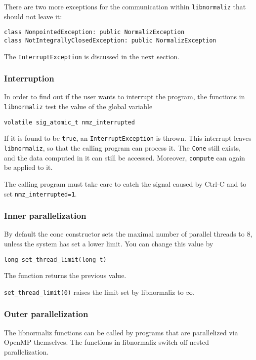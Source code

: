 \documentclass[12pt,a4paper]{scrartcl}
\theoremstyle{definition}
\begin{document}
\begin{small}
There are two more exceptions for the communication within \verb|libnormaliz| that should not leave it:
\begin{Verbatim}
class NonpointedException: public NormalizException 
class NotIntegrallyClosedException: public NormalizException
\end{Verbatim}

The \verb|InterruptException| is discussed in the next section.

\subsubsection{Interruption}

In order to find out if the user wants to interrupt the program, the functions in \verb|libnormaliz| test the value of the global variable
\begin{Verbatim}
volatile sig_atomic_t nmz_interrupted
\end{Verbatim}
If it is found to be \verb|true|, an \verb|InterruptException| is thrown. This interrupt leaves \verb|libnormaliz|, so that the calling program can process it. The \verb|Cone| still exists, and the data computed in it can still be accessed. Moreover, \verb|compute| can again be applied to it.

The calling program must take care to catch the signal caused by Ctrl-C and to set \verb|nmz_interrupted=1|.

\subsubsection{Inner parallelization}

By default the cone constructor sets the maximal number of parallel threads to $8$, unless the system has set a lower limit. You can change this value by
\begin{Verbatim}
long set_thread_limit(long t)
\end{Verbatim}
The function returns the previous value.

\verb|set_thread_limit(0)| raises the limit set by libnormaliz to $\infty$.

\subsubsection{Outer parallelization}

The libnormaliz functions can be called by programs that are parallelized via OpenMP themselves. The functions in libnormaliz switch off nested parallelization.


\end{small}
\end{document}
